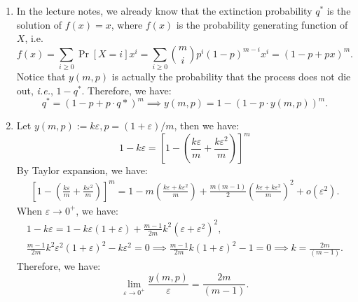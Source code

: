 \begin{answer}
    \begin{enumerate}[label=\alph*).]
        \item In the lecture notes, we already know that the extinction probability $q^*$ is the solution of $f(x) = x$, 
        where $f(x)$ is the probability generating function of $X$, i.e. 
        \begin{equation*}
            f(x) = \sum_{i\ge 0} \Pr[X=i] x^i = \sum_{i\ge 0} \binom{m}{i} p^i (1-p)^{m-i} x^i = (1-p + px)^m.
        \end{equation*}
        Notice that $y(m, p)$ is actually the probability that the process does not die out, \textit{i.e.}, $1-q^*$. Therefore, we have:
        \begin{equation}
            q^* = (1-p + p\cdot q*)^m \implies y(m,p) = 1 -  (1-p\cdot y(m,p))^m.
        \end{equation}
        \item Let $y(m, p) := k\varepsilon, p = (1+\varepsilon)/m$, then we have:
        \begin{equation*}
            1 - k\varepsilon = \left[1 - \left(\frac{k\varepsilon}{m} + \frac{k\varepsilon^2}{m}\right)\right]^m 
        \end{equation*}
        By Taylor expansion, we have:
        \begin{align*}
            \left[1 - \left(\frac{k\varepsilon}{m} + \frac{k\varepsilon^2}{m}\right)\right]^m  = 1 - m \left(\frac{k\varepsilon + k\varepsilon^2}{m}\right) + \frac{m(m-1)}{2}\left(\frac{k\varepsilon + k \varepsilon^2}{m}\right)^2 + o(\varepsilon^2).
        \end{align*}
        When $\varepsilon \to 0^+$, we have:
        \begin{gather*}
            1 - k\varepsilon =  1 - k\varepsilon(1 + \varepsilon) + \frac{m-1}{2m} k^2 (\varepsilon + \varepsilon^2)^2, \\
            \frac{m-1}{2m} k^2 \varepsilon^2(1 + \varepsilon)^2 - k \varepsilon^2 = 0 \implies \frac{m-1}{2m} k (1 + \varepsilon)^2 - 1 = 0 \implies k = \frac{2m}{(m-1)}.
        \end{gather*}
        Therefore, we have:
        \begin{equation*}
            \lim_{\varepsilon\to 0^+} \frac{y(m, p)}{\varepsilon} = \frac{2m}{(m-1)}.
        \end{equation*}
    \end{enumerate}
    \ed
\end{answer}